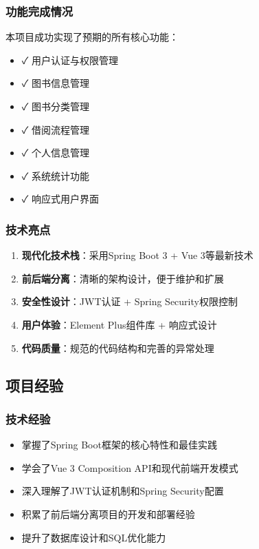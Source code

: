 \documentclass[12pt,a4paper]{article}
\begin{document}
\subsubsection{功能完成情况}
本项目成功实现了预期的所有核心功能：

\begin{itemize}
    \item ✓ 用户认证与权限管理
    \item ✓ 图书信息管理
    \item ✓ 图书分类管理
    \item ✓ 借阅流程管理
    \item ✓ 个人信息管理
    \item ✓ 系统统计功能
    \item ✓ 响应式用户界面
\end{itemize}

\subsubsection{技术亮点}
\begin{enumerate}
    \item \textbf{现代化技术栈}：采用Spring Boot 3 + Vue 3等最新技术
    \item \textbf{前后端分离}：清晰的架构设计，便于维护和扩展
    \item \textbf{安全性设计}：JWT认证 + Spring Security权限控制
    \item \textbf{用户体验}：Element Plus组件库 + 响应式设计
    \item \textbf{代码质量}：规范的代码结构和完善的异常处理
\end{enumerate}

\subsection{项目经验}

\subsubsection{技术经验}
\begin{itemize}
    \item 掌握了Spring Boot框架的核心特性和最佳实践
    \item 学会了Vue 3 Composition API和现代前端开发模式
    \item 深入理解了JWT认证机制和Spring Security配置
    \item 积累了前后端分离项目的开发和部署经验
    \item 提升了数据库设计和SQL优化能力
\end{itemize}
\end{document}
